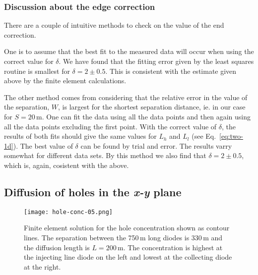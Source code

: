    \subsubsection{Discussion about the edge correction}

There are a couple of intuitive methods to check on the value of the
 end correction.

One is to assume that the best fit to the measured data will occur
when using the correct value for $\delta$.  We have found that the fitting
error given by the least squares routine is smallest for
 $\delta=2\pm 0.5$.  This is consistent with the estimate given above by
the finite element calculations.

The other method comes from considering that the relative error
in the value of the separation, $W$, is largest for the shortest
separation distance, ie.  in our case for $S=20$\,\textmu m.
One can fit the data using all the data points and then again using all
 the data points excluding the first point.  With the correct value of $\delta$,
the results of both fits should give the same values for $L_h$ and $L_l$
(see Eq.~\ref{eq:two-1d}).
The best value of $\delta$ can be found by trial and error.
The results varry somewhat for different data sets.
By this method we also find that $\delta=2\pm 0.5$, which is, again,
cosistent with the above.



\subsection{\label{sec:diff}Diffusion of holes in the \textit{x-y} plane}

\begin{figure}
\centering
\texttt{[image: hole-conc-05.png]}
\caption{Finite element solution for the hole concentration shown as
contour lines.  The separation between the 750\,\textmu m long
 diodes is 330\,\textmu m and the
diffusion length is $L=200$\,\textmu m.  The concentration is highest
 at the injecting line diode
on the left and lowest at the collecting diode at the right.
}%
\label{fig:hole-conc-05}
\end{figure}

